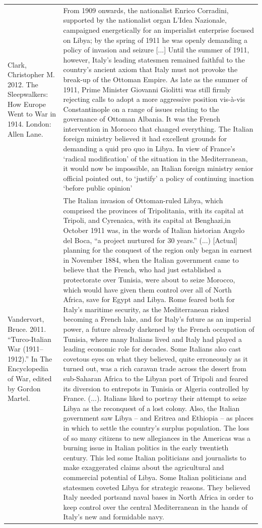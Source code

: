 {\begin{longtable}{p{}p{}}
\\
Clark, Christopher M. 2012. The Sleepwalkers: How Europe Went to War in 1914. London: Allen Lane.  & From 1909 onwards, the nationalist Enrico Corradini, supported by the nationalist organ L'Idea Nazionale, campaigned energetically for an imperialist enterprise focused on Libya; by the spring of 1911 he was openly demanding a policy of invasion and seizure [...] Until the summer of 1911, however, Italy's leading statesmen remained faithful to the country's ancient axiom that Italy must not provoke the break-up of the Ottoman Empire. As late as the summer of 1911, Prime Minister Giovanni Giolitti was still firmly rejecting calls to adopt a more aggressive position vis-à-vis Constantinople on a range of issues relating to the governance of Ottoman Albania. It was the French intervention in Morocco that changed everything. The Italian foreign ministry believed it had excellent grounds for demanding a quid pro quo in Libya. In view of France's ‘radical modification' of the situation in the Mediterranean, it would now be impossible, an Italian foreign ministry senior official pointed out, to ‘justify' a policy of continuing inaction ‘before public opinion'
\\
Vandervort, Bruce. 2011. “Turco-Italian War (1911–1912).” In The Encyclopedia of War, edited by Gordon Martel. & The Italian invasion of Ottoman-ruled Libya, which comprised the provinces of Tripolitania, with its capital at Tripoli, and Cyrenaica, with its capital at Benghazi,in October 1911 was, in the words of Italian historian Angelo del Boca, “a project nurtured for 30 years.” (...) [Actual] planning for the conquest of the region only began in earnest in November 1884, when the Italian government came to believe that the French, who had just established a protectorate over Tunisia, were about to seize Morocco, which would have given them control over all of North Africa, save for Egypt and Libya. Rome feared both for Italy's maritime security, as the Mediterranean risked becoming a French lake, and for Italy's future as an imperial power, a future already darkened by the French occupation of Tunisia, where many Italians lived and Italy had played a leading economic role for decades. Some Italians also cast covetous eyes on what they believed, quite erroneously as it turned out, was a rich caravan trade across the desert from sub-Saharan Africa to the Libyan port of Tripoli and feared its diversion to entrepots in Tunisia or Algeria controlled by France. (...). Italians liked to portray their attempt to seize Libya as the reconquest of a lost colony. Also, the Italian government saw Libya – and Eritrea and Ethiopia – as places in which to settle the country's surplus population. The loss of so many citizens to new allegiances in the Americas was a burning issue in Italian politics in the early twentieth century. This led some Italian politicians and journalists to make exaggerated claims about the agricultural and commercial potential of Libya. Some Italian politicians and statesmen coveted Libya for strategic reasons. They believed Italy needed portsand naval bases in North Africa in order to keep control over the central Mediterranean in the hands of Italy's new and formidable navy.

\end{longtable}}
